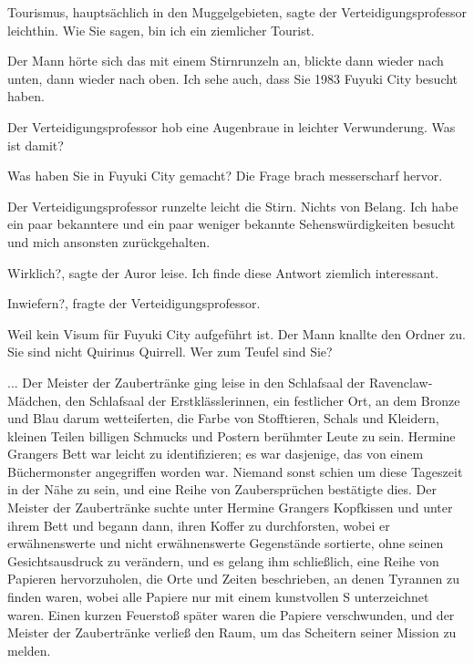 \glqq{}Tourismus, hauptsächlich in den Muggelgebieten\grqq{}, sagte der
Verteidigungsprofessor leichthin. \glqq{}Wie Sie sagen, bin ich ein ziemlicher
Tourist.\grqq{}

Der Mann hörte sich das mit einem Stirnrunzeln an, blickte dann wieder nach
unten, dann wieder nach oben. \glqq{}Ich sehe auch, dass Sie 1983 Fuyuki City
besucht haben.\grqq{}

Der Verteidigungsprofessor hob eine Augenbraue in leichter Verwunderung. \glqq{}
Was ist damit?\grqq{}

\glqq{}Was haben Sie in Fuyuki City gemacht?\grqq{} Die Frage brach messerscharf
hervor.

Der Verteidigungsprofessor runzelte leicht die Stirn. \glqq{}Nichts von Belang.
Ich habe ein paar bekanntere und ein paar weniger bekannte Sehenswürdigkeiten
besucht und mich ansonsten zurückgehalten.\grqq{}

\glqq{}Wirklich?\grqq{}, sagte der Auror leise. \glqq{}Ich finde diese Antwort
ziemlich interessant.\grqq{}

\glqq{}Inwiefern?\grqq{}, fragte der Verteidigungsprofessor.

\glqq{}Weil kein Visum für Fuyuki City aufgeführt ist.\grqq{} Der Mann knallte
den Ordner zu. \glqq{}Sie sind nicht Quirinus Quirrell. Wer zum Teufel sind
Sie?\grqq{}

... Der Meister der Zaubertränke ging leise in den Schlafsaal der
Ravenclaw-Mädchen, den Schlafsaal der Erstklässlerinnen, ein festlicher Ort, an
dem Bronze und Blau darum wetteiferten, die Farbe von Stofftieren, Schals und
Kleidern, kleinen Teilen billigen Schmucks und Postern berühmter Leute zu sein.
Hermine Grangers Bett war leicht zu identifizieren; es war dasjenige, das von
einem Büchermonster angegriffen worden war. Niemand sonst schien um diese
Tageszeit in der Nähe zu sein, und eine Reihe von Zaubersprüchen bestätigte
dies. Der Meister der Zaubertränke suchte unter Hermine Grangers Kopfkissen und
unter ihrem Bett und begann dann, ihren Koffer zu durchforsten, wobei er
erwähnenswerte und nicht erwähnenswerte Gegenstände sortierte, ohne seinen
Gesichtsausdruck zu verändern, und es gelang ihm schließlich, eine Reihe von
Papieren hervorzuholen, die Orte und Zeiten beschrieben, an denen Tyrannen zu
finden waren, wobei alle Papiere nur mit einem kunstvollen \glqq{}S\grqq{}
unterzeichnet waren. Einen kurzen Feuerstoß später waren die Papiere
verschwunden, und der Meister der Zaubertränke verließ den Raum, um das
Scheitern seiner Mission zu melden.

